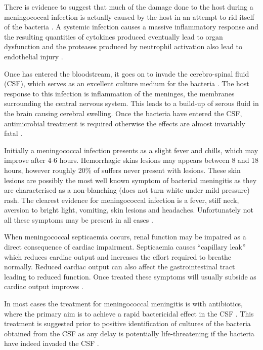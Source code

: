 There is evidence to suggest that much of the damage done to the host during a meningococcal infection is actually caused by the host in an attempt to rid itself of the bacteria \cite{NPathan07012003}. A systemic infection causes a massive inflammatory response and the resulting quantities of cytokines produced eventually lead to organ dysfunction and the proteases produced by neutrophil activation also lead to endothelial injury \cite{NPathan07012003}.

Once \Nm\space has entered the bloodstream, it goes on to invade the cerebro-spinal fluid (CSF), which serves as an excellent culture medium for the bacteria \cite{IWDeVoe06011982}. The host response to this infection is inflammation of the meninges, the membranes surrounding the central nervous system. This leads to a build-up of serous fluid in the brain causing cerebral swelling. Once the bacteria have entered the CSF, antimicrobial treatment is required otherwise the effects are almost invariably fatal \cite{IWDeVoe06011982}.

Initially a meningococcal infection presents as a slight fever and chills, which may improve after 4-6 hours. Hemorrhagic skins lesions may appears between 8 and 18 hours, however roughly 20\% of suffers never present with lesions. These skin lesions are possibly the most well known symptom of bacterial meningitis as they are characterised as a non-blanching (does not turn white under mild pressure) rash. The clearest evidence for meningococcal infection is a fever, stiff neck, aversion to bright light, vomiting, skin lesions and headaches. Unfortunately not all these symptoms may be present in all cases \cite{IWDeVoe06011982}.

When meningococcal septicaemia occurs, renal function may be impaired as a direct consequence of cardiac impairment. Septicaemia causes ``capillary leak'' which reduces cardiac output and increases the effort required to breathe normally. Reduced cardiac output can also affect the gastrointestinal tract leading to reduced function. Once treated these symptoms will usually subside as cardiac output improves \cite{NPathan07012003}.

In most cases the treatment for meningococcal meningitis is with antibiotics, where the primary aim is to achieve a rapid bactericidal effect in the CSF \cite{MarcelvanDeuren01012000}. This treatment is suggested prior to positive identification of cultures of the bacteria obtained from the CSF as any delay is potentially life-threatening if the bacteria have indeed invaded the CSF \cite{IWDeVoe06011982}.

